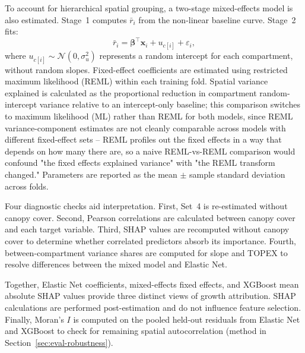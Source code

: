 To account for hierarchical spatial grouping, a two-stage mixed-effects model is also estimated. Stage~1 computes $\bar r_i$ from the non-linear baseline curve. Stage~2 fits:
\begin{equation}
\bar r_i=\boldsymbol{\beta}^{\top}\mathbf{x}_i+u_{c[i]}+\varepsilon_i,
\label{eq:mixed-effects}
\end{equation}
where $u_{c[i]}\sim\mathcal{N}(0,\sigma_u^2)$ represents a random intercept for each compartment, without random slopes. Fixed-effect coefficients are estimated using restricted maximum likelihood (REML) within each training fold. Spatial variance explained is calculated as the proportional reduction in compartment random-intercept variance relative to an intercept-only baseline; this comparison switches to maximum likelihood (ML) rather than REML for both models, since REML variance-component estimates are not cleanly comparable across models with different fixed-effect sets -- REML profiles out the fixed effects in a way that depends on how many there are, so a naive REML-vs-REML comparison would confound "the fixed effects explained variance" with "the REML transform changed." Parameters are reported as the mean $\pm$ sample standard deviation across folds.

Four diagnostic checks aid interpretation. First, Set~4 is re-estimated without canopy cover. Second, Pearson correlations are calculated between canopy cover and each target variable. Third, SHAP values are recomputed without canopy cover to determine whether correlated predictors absorb its importance. Fourth, between-compartment variance shares are computed for slope and TOPEX to resolve differences between the mixed model and Elastic Net.

Together, Elastic Net coefficients, mixed-effects fixed effects, and XGBoost mean absolute SHAP values provide three distinct views of growth attribution. SHAP calculations are performed post-estimation and do not influence feature selection. Finally, Moran's $I$ is computed on the pooled held-out residuals from Elastic Net and XGBoost to check for remaining spatial autocorrelation (method in Section~\ref{sec:eval-robustness}).


